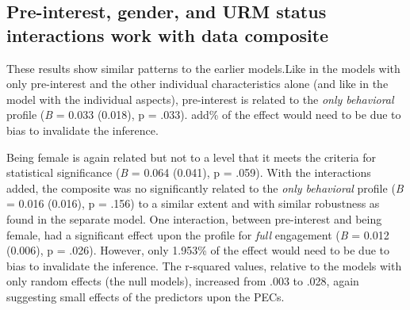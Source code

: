 \documentclass[]{book}
\theoremstyle{definition}
\theoremstyle{definition}
\theoremstyle{definition}
\theoremstyle{remark}
\begin{document}
\begin{landscape}\begin{table}

\caption{\label{tab:unnamed-chunk-14}Results of mixed effects models with interest and other characteristics}
\centering
{}
\end{table}
\end{landscape}

\subsection{Pre-interest, gender, and URM status interactions work with
data
composite}\label{pre-interest-gender-and-urm-status-interactions-work-with-data-composite}

These results show similar patterns to the earlier models.Like in the
models with only pre-interest and the other individual characteristics
alone (and like in the model with the individual aspects), pre-interest
is related to the \emph{only behavioral} profile (\emph{B} = 0.033
(0.018), p = .033). add\% of the effect would need to be due to bias to
invalidate the inference.

Being female is again related but not to a level that it meets the
criteria for statistical significance (\emph{B} = 0.064 (0.041), p =
.059). With the interactions added, the composite was no significantly
related to the \emph{only behavioral} profile (\emph{B} = 0.016 (0.016),
p = .156) to a similar extent and with similar robustness as found in
the separate model. One interaction, between pre-interest and being
female, had a significant effect upon the profile for \emph{full}
engagement (\emph{B} = 0.012 (0.006), p = .026). However, only 1.953\%
of the effect would need to be due to bias to invalidate the inference.
The r-squared values, relative to the models with only random effects
(the null models), increased from .003 to .028, again suggesting small
effects of the predictors upon the PECs.
\end{document}
